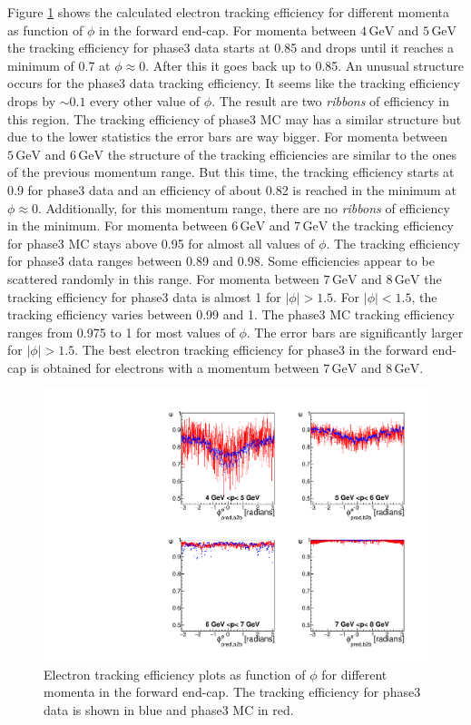 \documentclass[a4paper,11pt,twosided,final,german,openbib,pdftex,listof=totoc,bibliography=totoc]{scrbook}
\begin{document}
Figure \ref{plt:xPMPhiemFC3} shows the calculated electron tracking efficiency for different momenta as function of $\phi$ in the forward end-cap.
For momenta between $4\,\textrm{GeV}$ and $5\,\textrm{GeV}$ the tracking efficiency for phase3 data starts at 0.85 and drops until it reaches a minimum of 0.7 at $\phi \approx 0$. After this it goes back up to 0.85. An unusual structure occurs for the phase3 data tracking efficiency. It seems like the tracking efficiency drops by $\sim 0.1$ every other value of $\phi$. The result are two \textit{ribbons} of efficiency in this region. The tracking efficiency of phase3 MC may has a similar structure but due to the lower statistics the error bars are way bigger.
For momenta between $5\,\textrm{GeV}$ and $6\,\textrm{GeV}$ the structure of the tracking efficiencies are similar to the ones of the previous momentum range. But this time, the tracking efficiency starts at 0.9 for phase3 data and an efficiency of about 0.82 is reached in the minimum at $\phi \approx 0$. Additionally, for this momentum range, there are no \textit{ribbons} of efficiency in the minimum.
For momenta between $6\,\textrm{GeV}$ and $7\,\textrm{GeV}$ the tracking efficiency for phase3 MC stays above 0.95 for almost all values of $\phi$. The tracking efficiency for phase3 data ranges between 0.89 and 0.98. Some efficiencies appear to be scattered randomly in this range.
For momenta between $7\,\textrm{GeV}$ and $8\,\textrm{GeV}$ the tracking efficiency for phase3 data is almost 1 for $|\phi| > 1.5$. For $|\phi| < 1.5$, the tracking efficiency varies between 0.99 and 1. The phase3 MC tracking efficiency ranges from 0.975 to 1 for most values of $\phi$. The error bars are significantly larger for $|\phi| > 1.5$.
The best electron tracking efficiency for phase3 in the forward end-cap is obtained for electrons with a momentum between $7\,\textrm{GeV}$ and $8\,\textrm{GeV}$.

\begin{figure}[!htbp]
	\centering
	\includegraphics[width=\textwidth]{Plots/master3/xPMPhiemFCP3}
	\caption[Momentum $\phi$ Electron Forward End-Cap Efficiency Phase3]{Electron tracking efficiency plots as function of $\phi$ for different momenta in the forward end-cap. The tracking efficiency for phase3 data is shown in blue and phase3 MC in red.}
	\label{plt:xPMPhiemFC3}
\end{figure}
\end{document}
